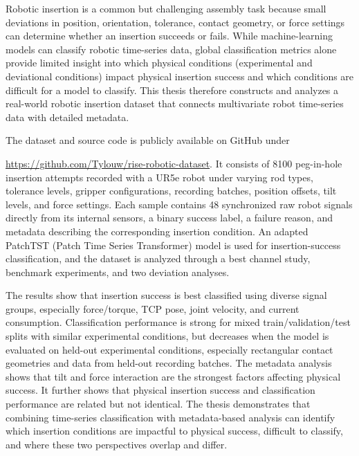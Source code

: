 \setlength{\parindent}{0pt}
\normalsize

Robotic insertion is a common but challenging assembly task because small deviations in position, orientation, tolerance, contact geometry, or force settings can determine whether an insertion succeeds or fails. While machine-learning models can classify robotic time-series data, global classification metrics alone provide limited insight into which physical conditions (experimental and deviational conditions) impact physical insertion success and which conditions are difficult for a model to classify. This thesis therefore constructs and analyzes a real-world robotic insertion dataset that connects multivariate robot time-series data with detailed metadata.

The dataset and source code is publicly available on GitHub under

\url{https://github.com/Tylouw/rise-robotic-dataset}. It consists of 8100 peg-in-hole insertion attempts recorded with a UR5e robot under varying rod types, tolerance levels, gripper configurations, recording batches, position offsets, tilt levels, and force settings. Each sample contains 48 synchronized raw robot signals directly from its internal sensors, a binary success label, a failure reason, and metadata describing the corresponding insertion condition. An adapted PatchTST (Patch Time Series Transformer) model is used for insertion-success classification, and the dataset is analyzed through a best channel study, benchmark experiments, and two deviation analyses.

The results show that insertion success is best classified using diverse signal groups, especially force/torque, TCP pose, joint velocity, and current consumption. Classification performance is strong for mixed train/validation/test splits with similar experimental conditions, but decreases when the model is evaluated on held-out experimental conditions, especially rectangular contact geometries and data from held-out recording batches. The metadata analysis shows that tilt and force interaction are the strongest factors affecting physical success. It further shows that physical insertion success and classification performance are related but not identical. The thesis demonstrates that combining time-series classification with metadata-based analysis can identify which insertion conditions are impactful to physical success, difficult to classify, and where these two perspectives overlap and differ.
